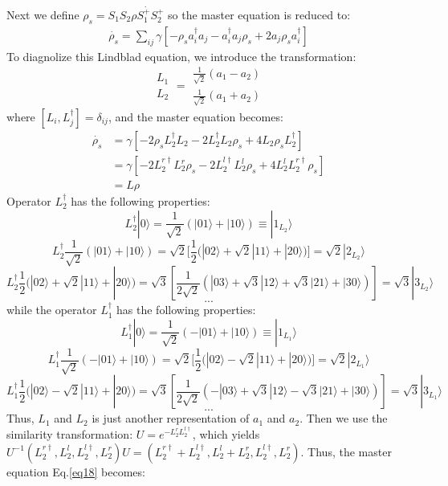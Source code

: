 \documentclass[aps,showpacs,onecolumn,twoside,groupedaddress]{revtex4}
\begin{document}
Next we define $ \rho_{s}=S_{1}S_{2}\dot{\rho S_{1}^{+}S_{2}^{+}}$ so the master equation is reduced to:
\begin{equation}
\label{eq17}
\begin{split}
\dot{\rho_{s}}=\sum_{ij}\gamma[-\rho_{s}a_{i}^{\dagger}a_{j}-a_{i}^{\dagger}a_{j}\rho_{s}+2a_{j}\rho_{s}a_{i}^{\dagger}]
\end{split}
\end{equation}
To diagnolize this Lindblad equation, we introduce the transformation: $$\begin{array}{c}
L_{1}\\
L_{2}
\end{array}=\begin{array}{c}
\frac{1}{\sqrt{2}}(a_{1}-a_{2})\\
\frac{1}{\sqrt{2}}(a_{1}+a_{2})
\end{array}$$
where $[L_{i},L_{j}^{\dagger}]=\delta_{ij}$, and the master equation becomes:
\begin{equation}
\label{eq18}
\begin{split}
\dot{\rho_{s}}&=\gamma[-2\rho_{s}L_{2}^{\dagger}L_{2}-2L_{2}^{\dagger}L_{2}\rho_{s}+4L_{2}\rho_{s}L_{2}^{\dagger}]\\
&=\gamma[-2L_{2}^{r\dagger}L_{2}^{r}\rho_{s}-2L_{2}^{l\dagger}L_{2}^{l}\rho_{s}+4L_{2}^{l}L_{2}^{r\dagger}\rho_{s}]\\
&=L\rho
\end{split}
\end{equation}
Operator $L_2^{\dagger}$ has the following properties: $$L_{2}^{\dagger}|0\rangle=\frac{1}{\sqrt{2}}(|01\rangle+|10\rangle)\equiv|1_{L_2}\rangle$$ $$L_{2}^{\dagger}\frac{1}{\sqrt{2}}(|01\rangle+|10\rangle)=\sqrt{2}[\frac{1}{2}(|02\rangle+\sqrt{2}|11\rangle+|20\rangle)]=\sqrt{2}|2_{L_2}\rangle$$  $$L_{2}^{\dagger}\frac{1}{2}(|02\rangle+\sqrt{2}|11\rangle+|20\rangle)=\sqrt{3}[\frac{1}{2\sqrt{2}}(|03\rangle+\sqrt{3}|12\rangle+\sqrt{3}|21\rangle+|30\rangle)]=\sqrt{3}|3_{L_2}\rangle$$  $$...$$
while the operator $L_1^{\dagger}$ has the following properties: $$L_{1}^{\dagger}|0\rangle=\frac{1}{\sqrt{2}}(-|01\rangle+|10\rangle)\equiv|1_{L_{1}}\rangle$$ $$L_{1}^{\dagger}\frac{1}{\sqrt{2}}(-|01\rangle+|10\rangle)=\sqrt{2}[\frac{1}{2}(|02\rangle-\sqrt{2}|11\rangle+|20\rangle)]=\sqrt{2}|2_{L_{1}}\rangle$$  $$L_{1}^{\dagger}\frac{1}{2}(|02\rangle-\sqrt{2}|11\rangle+|20\rangle)=\sqrt{3}[\frac{1}{2\sqrt{2}}(-|03\rangle+\sqrt{3}|12\rangle-\sqrt{3}|21\rangle+|30\rangle)]=\sqrt{3}|3_{L_{1}}\rangle$$  $$...$$
Thus, $L_1$ and $L_2$ is just another representation of $a_1$ and $a_2$. Then we use the similarity transformation: $U=e^{-L_2^{r}L_2^{l\dagger}}$, which yields $U^{-1}(L_{2}^{r\dagger},L_{2}^{l},L_{2}^{l\dagger},L_{2}^{r})U=(L_{2}^{r\dagger}+L_{2}^{l\dagger},L_{2}^{l}+L_{2}^{r},L_{2}^{l\dagger},L_{2}^{r}) $. Thus, the master equation Eq.\eqref{eq18} becomes:
\end{document}
